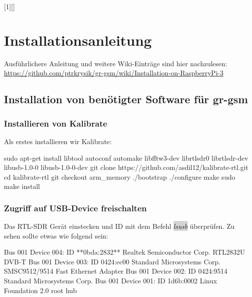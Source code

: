 [1][]%
{
   \noindent
   \minipage{\linewidth} 
   \vspace{0.5\baselineskip}
   \lstset{basicstyle=\ttfamily\footnotesize,frame=single,#1,breaklines=true}}
{\endminipage}

\chapter{Installationsanleitung}

Ausführlichere Anleitung und weitere Wiki-Einträge sind hier nachzulesen:\\
\url{https://github.com/ptrkrysik/gr-gsm/wiki/Installation-on-RaspberryPi-3}


\section{Installation von benötigter Software für gr-gsm}

\subsection{Installieren von Kalibrate}

Als erstes installieren wir Kalibrate:

\begin{code}[	numbers=left,stepnumber=1]
sudo apt-get install libtool autoconf automake libfftw3-dev librtlsdr0 librtlsdr-dev libusb-1.0-0 libusb-1.0-0-dev
git clone https://github.com/asdil12/kalibrate-rtl.git
cd kalibrate-rtl
git checkout arm_memory
./bootstrap
./configure
make
sudo make install 
\end{code}

\subsection{Zugriff auf USB-Device freischalten}

Das RTL-SDR Gerät einstecken und ID mit dem Befehl \colorbox{lightgray}{\emph{lsusb}} überprüfen. Zu sehen sollte etwas wie folgend sein:

\begin{code}
Bus 001 Device 004: ID **0bda:2832** Realtek Semiconductor Corp. RTL2832U DVB-T
Bus 001 Device 003: ID 0424:ec00 Standard Microsystems Corp. SMSC9512/9514 Fast Ethernet Adapter
Bus 001 Device 002: ID 0424:9514 Standard Microsystems Corp.
Bus 001 Device 001: ID 1d6b:0002 Linux Foundation 2.0 root hub
\end{code}

